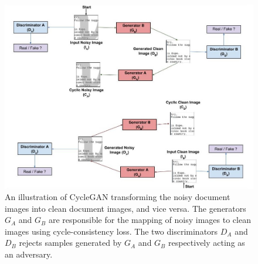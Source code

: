 \begin{figure}[H]
        \begin{center}
 	    \includegraphics[scale=0.60]{images/relatedWorks/LearningToClean.jpg}
	    \caption[An illustration of \ac{CycleGAN} transforming the noisy document images into clean document images, and vice versa.]{An illustration of \ac{CycleGAN} transforming the noisy document images into clean document images, and vice versa. The generators $G_A$ and $G_B$ are responsible for the mapping of noisy images to clean images using cycle-consistency loss\cite{zhu2020unpaired}. The two discriminators $D_A$ and $D_B$ rejects samples generated by $G_A$ and $G_B$ respectively acting as an adversary\cite{sharma2019learning}.}
	    \label{fig:LearningToClean}
	    \end{center}
\end{figure}



